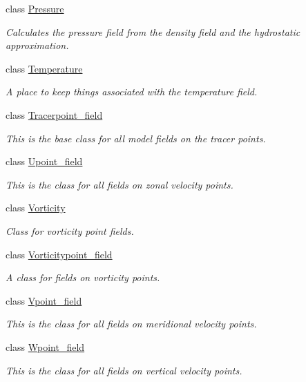 \begin{DoxyCompactItemize}
class \hyperlink{classmitgcm_1_1core_1_1Pressure}{Pressure}
\begin{DoxyCompactList}\small\item\em Calculates the pressure field from the density field and the hydrostatic approximation. \end{DoxyCompactList}\item 
class \hyperlink{classmitgcm_1_1core_1_1Temperature}{Temperature}
\begin{DoxyCompactList}\small\item\em A place to keep things associated with the temperature field. \end{DoxyCompactList}\item 
class \hyperlink{classmitgcm_1_1core_1_1Tracerpoint__field}{Tracerpoint\+\_\+field}
\begin{DoxyCompactList}\small\item\em This is the base class for all model fields on the tracer points. \end{DoxyCompactList}\item 
class \hyperlink{classmitgcm_1_1core_1_1Upoint__field}{Upoint\+\_\+field}
\begin{DoxyCompactList}\small\item\em This is the class for all fields on zonal velocity points. \end{DoxyCompactList}\item 
class \hyperlink{classmitgcm_1_1core_1_1Vorticity}{Vorticity}
\begin{DoxyCompactList}\small\item\em Class for vorticity point fields. \end{DoxyCompactList}\item 
class \hyperlink{classmitgcm_1_1core_1_1Vorticitypoint__field}{Vorticitypoint\+\_\+field}
\begin{DoxyCompactList}\small\item\em A class for fields on vorticity points. \end{DoxyCompactList}\item 
class \hyperlink{classmitgcm_1_1core_1_1Vpoint__field}{Vpoint\+\_\+field}
\begin{DoxyCompactList}\small\item\em This is the class for all fields on meridional velocity points. \end{DoxyCompactList}\item 
class \hyperlink{classmitgcm_1_1core_1_1Wpoint__field}{Wpoint\+\_\+field}
\begin{DoxyCompactList}\small\item\em This is the class for all fields on vertical velocity points. \end{DoxyCompactList}\end{DoxyCompactItemize}
